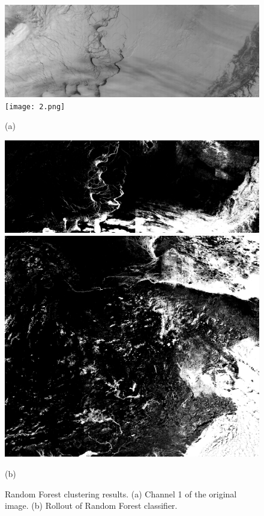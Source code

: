 \documentclass{article}
\begin{document}
        \begin{figure}[ht]
            \centering
            \begin{minipage}{0.49\hsize}
                \centering
                \includegraphics[width = 1\hsize]{1.png}
                \texttt{[image: 2.png]}
                \caption*{(a)}
            \end{minipage}
            \begin{minipage}{0.49\hsize}
                \centering
                \includegraphics[width = 1\hsize]{1_random_forest.png}
                \includegraphics[width = 1\hsize]{2_random_forest.png}
                \caption*{(b)}
            \end{minipage}
            \caption{
                Random Forest clustering results.
                (a) Channel 1 of the original image.
                (b) Rollout of Random Forest classifier.
            }
            \label{fig:random_forest}
        \end{figure}
\end{document}
